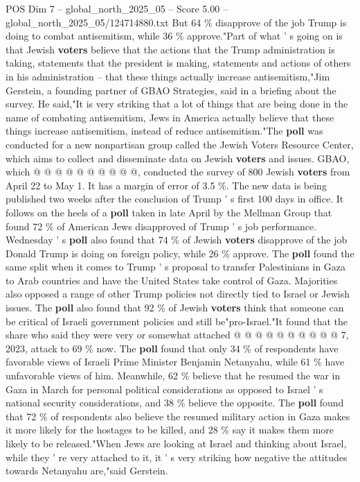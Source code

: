 \begin{textsample}{POS Dim 7 – global\_north\_2025\_05 – Score 5.00 – global\_north\_2025\_05/124714880.txt}
But 64 \% disapprove of the job Trump is doing to combat antisemitism, while 36 \% approve."Part of what ' s going on is that Jewish \textbf{voters} believe that the actions that the Trump administration is taking, statements that the president is making, statements and actions of others in his administration -- that these things actually increase antisemitism,"Jim Gerstein, a founding partner of GBAO Strategies, said in a briefing about the survey.
He said,"It is very striking that a lot of things that are being done in the name of combating antisemitism, Jews in America actually believe that these things increase antisemitism, instead of reduce antisemitism."The \textbf{poll} was conducted for a new nonpartisan group called the Jewish Voters Resource Center, which aims to collect and disseminate data on Jewish \textbf{voters} and issues.
GBAO, which @ @ @ @ @ @ @ @ @ @, conducted the survey of 800 Jewish \textbf{voters} from April 22 to May 1.
It has a margin of error of 3.5 \%.
The new data is being published two weeks after the conclusion of Trump ' s first 100 days in office.
It follows on the heels of a \textbf{poll} taken in late April by the Mellman Group that found 72 \% of American Jews disapproved of Trump ' s job performance.
Wednesday ' s \textbf{poll} also found that 74 \% of Jewish \textbf{voters} disapprove of the job Donald Trump is doing on foreign policy, while 26 \% approve.
The \textbf{poll} found the same split when it comes to Trump ' s proposal to transfer Palestinians in Gaza to Arab countries and have the United States take control of Gaza.
Majorities also opposed a range of other Trump policies not directly tied to Israel or Jewish issues.
The \textbf{poll} also found that 92 \% of Jewish \textbf{voters} think that someone can be critical of Israeli government policies and still be"pro-Israel."It found that the share who said they were very or somewhat attached @ @ @ @ @ @ @ @ @ @ 7, 2023, attack to 69 \% now.
The \textbf{poll} found that only 34 \% of respondents have favorable views of Israeli Prime Minister Benjamin Netanyahu, while 61 \% have unfavorable views of him.
Meanwhile, 62 \% believe that he resumed the war in Gaza in March for personal political considerations as opposed to Israel ' s national security considerations, and 38 \% believe the opposite.
The \textbf{poll} found that 72 \% of respondents also believe the resumed military action in Gaza makes it more likely for the hostages to be killed, and 28 \% say it makes them more likely to be released."When Jews are looking at Israel and thinking about Israel, while they ' re very attached to it, it ' s very striking how negative the attitudes towards Netanyahu are,"said Gerstein.

\end{textsample}
